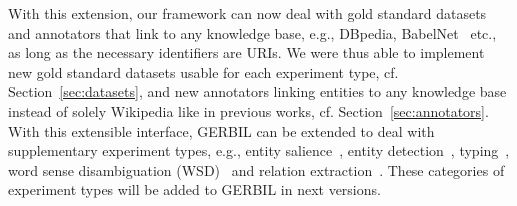 With this extension, our framework can now deal with gold standard datasets and annotators that link to any knowledge base, e.g., DBpedia, BabelNet~\cite{NavigliPonzetto:12aij} etc., as long as the necessary identifiers are URIs.
We were thus able to implement \numberOfadditionalDatasets new gold standard datasets usable for each experiment type, cf. Section~\ref{sec:datasets}, and \numberOfadditionalAnnotators new annotators linking entities to any knowledge base instead of solely Wikipedia like in previous works, cf. Section~\ref{sec:annotators}.
With this extensible interface, GERBIL can be extended to deal with supplementary experiment types, e.g., entity salience~\cite{cornolti}, entity detection~\cite{FOX}, typing~\cite{rizzo2014}, word sense disambiguation (WSD)~\cite{babelfy} and relation extraction~\cite{FOX}.
These categories of experiment types will be added to GERBIL in next versions.

